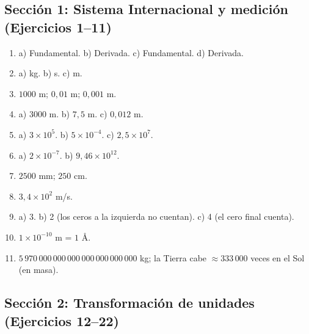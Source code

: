 \documentclass[12pt, letterpaper]{article}
\begin{document}
  \subsection*{Sección 1: Sistema Internacional y medición (Ejercicios 1--11)}

  \begin{enumerate}[leftmargin=*, label=\textbf{\arabic*.}]
    \setcounter{enumi}{0}
    \item a) Fundamental. \quad b) Derivada. \quad c) Fundamental. \quad d) Derivada.
    \item a) kg. \quad b) s. \quad c) m.
    \item $1000$ m; $0{,}01$ m; $0{,}001$ m.
    \item a) $3000$ m. \quad b) $7{,}5$ m. \quad c) $0{,}012$ m.
    \item a) $3 \times 10^{5}$. \quad b) $5 \times 10^{-4}$. \quad c) $2{,}5 \times 10^{7}$.
    \item a) $2 \times 10^{-7}$. \quad b) $9{,}46 \times 10^{12}$.
    \item $2500$ mm; $250$ cm.
    \item $3{,}4 \times 10^{2}$ m/s.
    \item a) 3. \quad b) 2 (los ceros a la izquierda no cuentan). \quad c) 4 (el cero final cuenta).
    \item $1 \times 10^{-10}$ m = $1$ \AA.
    \item $5\,970\,000\,000\,000\,000\,000\,000\,000$ kg; la Tierra cabe $\approx 333\,000$ veces en el Sol (en masa).
  \end{enumerate}

  \subsection*{Sección 2: Transformación de unidades (Ejercicios 12--22)}
\end{document}
